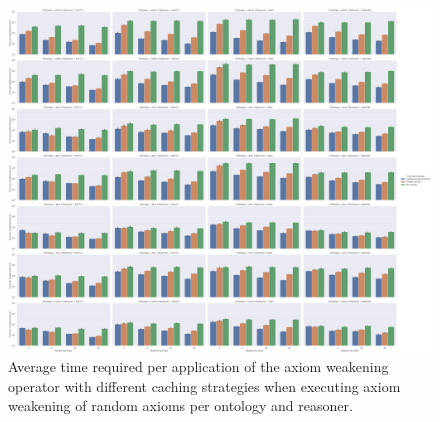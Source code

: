 \begin{figure}[ht]
    \begin{widepage}[3cm]
      \centering
      \includegraphics[width=\textwidth]{resources/time-cache-ontology-reasoner-bar.png}
    \end{widepage}
    \caption{Average time required per application of the axiom weakening operator with different caching strategies when executing axiom weakening of random axioms per ontology and reasoner.}
\end{figure}


